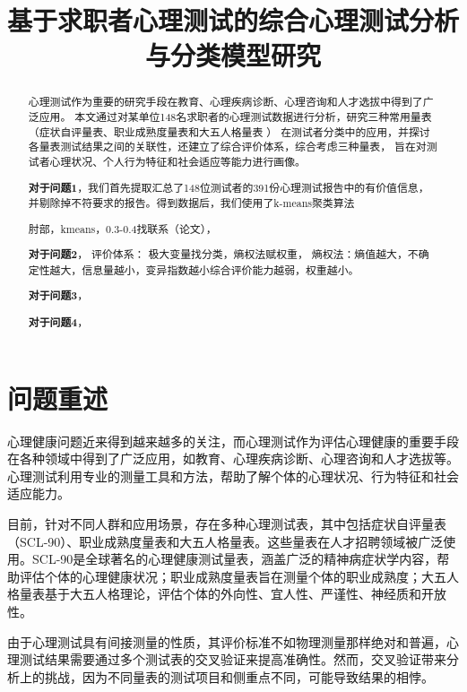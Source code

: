 \documentclass[withoutpreface,bwprint]{cumcmthesis} %
\title{基于求职者心理测试的综合心理测试分析与分类模型研究}
\begin{document}
 \maketitle
 \begin{abstract}
    心理测试作为重要的研究手段在教育、心理疾病诊断、心理咨询和人才选拔中得到了广泛应用。
    本文通过对某单位148名求职者的心理测试数据进行分析，研究三种常用量表（症状自评量表、职业成熟度量表和大五人格量表 ）
    在测试者分类中的应用，并探讨各量表测试结果之间的关联性，还建立了综合评价体系，综合考虑三种量表，
    旨在对测试者心理状况、个人行为特征和社会适应等能力进行画像。

    \textbf{对于问题1}，我们首先提取汇总了148位测试者的391份心理测试报告中的有价值信息，并剔除掉不符要求的报告。得到数据后，我们使用了k-means聚类算法
    

    肘部，kmeans，0.3-0.4找联系（论文），   



    \textbf{对于问题2}，
    评价体系：
    极大变量找分类，熵权法赋权重，
    熵权法：熵值越大，不确定性越大，信息量越小，变异指数越小综合评价能力越弱，权重越小。
    
    \textbf{对于问题3}，

    
    \textbf{对于问题4}，

\end{abstract}



\section{问题重述}

心理健康问题近来得到越来越多的关注，而心理测试作为评估心理健康的重要手段在各种领域中得到了广泛应用，如教育、心理疾病诊断、心理咨询和人才选拔等。心理测试利用专业的测量工具和方法，帮助了解个体的心理状况、行为特征和社会适应能力。

目前，针对不同人群和应用场景，存在多种心理测试表，其中包括症状自评量表（SCL-90）、职业成熟度量表和大五人格量表。这些量表在人才招聘领域被广泛使用。SCL-90是全球著名的心理健康测试量表，涵盖广泛的精神病症状学内容，帮助评估个体的心理健康状况；职业成熟度量表旨在测量个体的职业成熟度；大五人格量表基于大五人格理论，评估个体的外向性、宜人性、严谨性、神经质和开放性。

由于心理测试具有间接测量的性质，其评价标准不如物理测量那样绝对和普遍，心理测试结果需要通过多个测试表的交叉验证来提高准确性。然而，交叉验证带来分析上的挑战，因为不同量表的测试项目和侧重点不同，可能导致结果的相悖。
\end{document}
